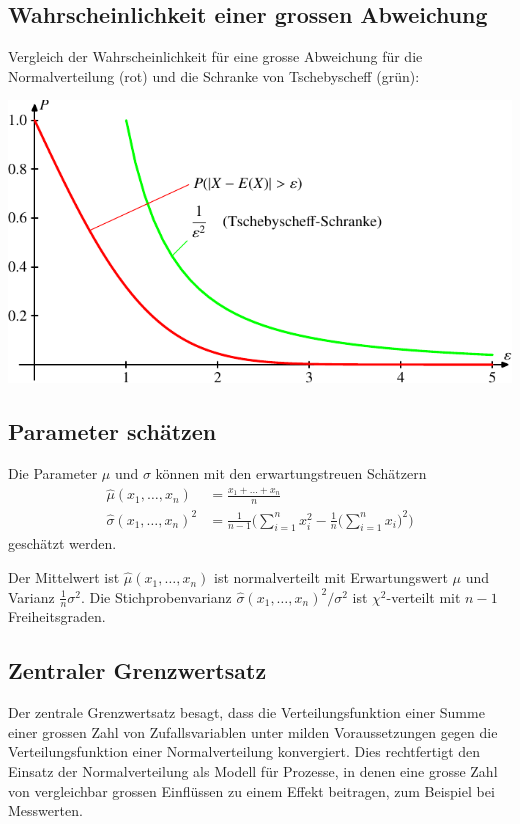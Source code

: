\subsection{Wahrscheinlichkeit einer grossen Abweichung}
Vergleich der Wahrscheinlichkeit für eine grosse Abweichung
für die Normalverteilung (rot) und die Schranke von Tschebyscheff (grün):
\begin{center}
\includegraphics{images/norm-1.pdf}
\end{center}

\subsection{Parameter schätzen}
Die Parameter $\mu$ und $\sigma$ können mit den erwartungstreuen Schätzern
\begin{align*}
\hat\mu(x_1,\dots,x_n)&=\frac{x_1+\dots+x_n}{n}\\
\hat\sigma(x_1,\dots,x_n)^2&=\frac{1}{n-1}\biggl(
\sum_{i=1}^n x_i^2 - \frac1n\biggl(\sum_{i=1}^n x_i\biggr)^2
\biggr)
\end{align*}
geschätzt werden.

Der Mittelwert ist $\hat\mu(x_1,\dots,x_n)$ ist normalverteilt mit Erwartungswert
$\mu$ und Varianz $\frac1n\sigma^2$.
Die Stichprobenvarianz $\hat\sigma(x_1,\dots,x_n)^2/\sigma^2$ ist $\chi^2$-verteilt
mit $n-1$ Freiheitsgraden.

\subsection{Zentraler Grenzwertsatz}
Der zentrale Grenzwertsatz besagt, dass die Verteilungsfunktion einer Summe
einer grossen Zahl von Zufallsvariablen unter milden Voraussetzungen
gegen die Verteilungsfunktion einer Normalverteilung konvergiert.
Dies rechtfertigt den Einsatz der Normalverteilung als Modell für Prozesse,
in denen eine grosse Zahl von vergleichbar grossen Einflüssen zu einem Effekt
beitragen, zum Beispiel bei Messwerten.

